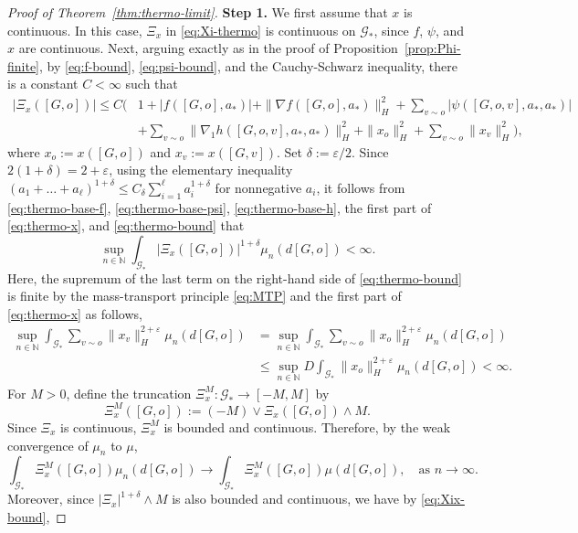 \documentclass[11pt]{article}
\def\eps{\varepsilon}
\newcommand{\N}{{\mathbb N}}
\newcommand{\be}{\begin{equation}}
\newcommand{\ee}{\end{equation}}
\numberwithin{equation}{section}
\begin{document}
\begin{proof}[Proof of Theorem~\ref{thm:thermo-limit}]
\textbf{Step 1.} We first assume that $x$ is continuous. In this case, \(\Xi_x\) in \eqref{eq:Xi-thermo} is continuous on $\mathcal{G}_\ast$, since $f$, $\psi$, and $x$ are continuous. Next, arguing exactly as in the proof of Proposition~\ref{prop:Phi-finite}, by \eqref{eq:f-bound}, \eqref{eq:psi-bound}, and the Cauchy-Schwarz inequality, there is a constant \(C<\infty\) such that
\begin{equation}\begin{aligned}\label{eq:thermo-bound}
|\Xi_x([G,o])|
\le
C\Big(&
1+|f([G,o],a_\ast)|+\|\nabla f([G,o],a_\ast)\|_H^2
+\sum_{v\sim o}|\psi([G,o,v],a_\ast,a_\ast)|\\
&+\sum_{v\sim o}\|\nabla_1 h([G,o,v],a_\ast,a_\ast)\|_H^2+\|x_o\|_H^2+\sum_{v\sim o}\|x_v\|_H^2
\Big),
\end{aligned}\end{equation}
where \(x_o:=x([G,o])\) and \(x_v:=x([G,v])\). Set \(\delta:=\eps/2\). Since \(2(1+\delta)=2+\eps\), using the elementary inequality \((a_1+\dots+a_\ell)^{1+\delta}\le C_\delta\sum_{i=1}^\ell a_i^{1+\delta}\) for nonnegative \(a_i\), it follows from \eqref{eq:thermo-base-f}, \eqref{eq:thermo-base-psi}, \eqref{eq:thermo-base-h}, the first part of \eqref{eq:thermo-x}, and \eqref{eq:thermo-bound} that
\be\label{eq:Xix-bound}
\sup_{n\in\N}\int_{\mathcal G_\ast}|\Xi_x([G,o])|^{1+\delta}\mu_n(d[G,o])<\infty.
\ee
Here, the supremum of the last term on the right-hand side of \eqref{eq:thermo-bound} is finite by the mass-transport principle \eqref{eq:MTP} and the first part of \eqref{eq:thermo-x} as follows,
\be\begin{aligned}
\sup_{n\in\N}\int_{\mathcal G_\ast}\sum_{v\sim o}\|x_v\|_H^{2+\eps}\mu_n(d[G,o])
&=
\sup_{n\in\N}\int_{\mathcal G_\ast}\sum_{v\sim o}\|x_o\|_H^{2+\eps}\mu_n(d[G,o])\\
&\le
\sup_{n\in\N}D\int_{\mathcal G_\ast}\|x_o\|_H^{2+\eps}\mu_n(d[G,o])<\infty.
\end{aligned}\ee
For \(M>0\), define the truncation $\Xi_x^M:\mathcal G_\ast\to [-M,M]$ by
\be\label{eq:XiM-thermo}
\Xi_x^M([G,o]):=(-M)\vee \Xi_x([G,o])\wedge M.
\ee
Since \(\Xi_x\) is continuous, \(\Xi_x^M\) is bounded and continuous. Therefore, by the weak convergence of \(\mu_n\) to \(\mu\),
\begin{equation}\label{eq:trunc-conv}
\int_{\mathcal G_\ast}\Xi_x^M([G,o])\mu_n(d[G,o])
\longrightarrow
\int_{\mathcal G_\ast}\Xi_x^M([G,o])\mu(d[G,o]),
\quad \text{as } n \to \infty.
\end{equation}
Moreover, since \(|\Xi_x|^{1+\delta}\wedge M\) is also bounded and continuous, we have by \eqref{eq:Xix-bound},

\end{proof}
\end{document}
